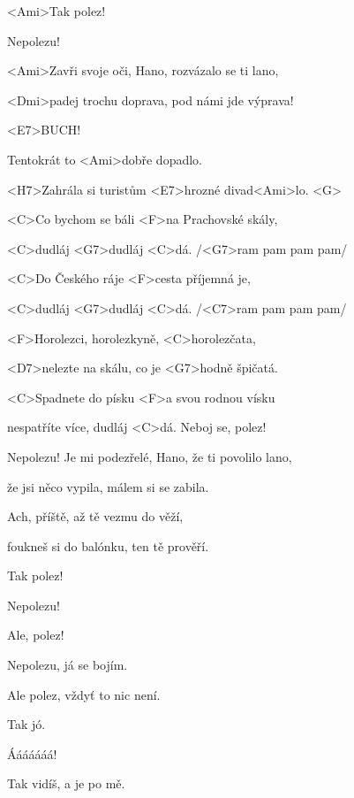 

<Ami>Tak polez!

Nepolezu!

\zs
<Ami>Zavři svoje oči, Hano, rozvázalo se ti lano,

<Dmi>padej trochu doprava, pod námi jde výprava!

<E7>BUCH!

Tentokrát to <Ami>dobře dopadlo.

<H7>Zahrála si turistům <E7>hrozné divad<Ami>lo. <G> \ks

\zr
<C>Co bychom se báli <F>na Prachovské skály,

<C>dudláj <G7>dudláj <C>dá. /<G7>ram pam pam pam/

<C>Do Českého ráje <F>cesta příjemná je,

<C>dudláj <G7>dudláj <C>dá. /<C7>ram pam pam pam/

<F>Horolezci, horolezkyně, <C>horolezčata,

<D7>nelezte na skálu, co je <G7>hodně špičatá.

<C>Spadnete do písku <F>a svou rodnou vísku

nespatříte více, dudláj <C>dá.
\kr
Neboj se, polez!

Nepolezu!
\zs
Je mi podezřelé, Hano, že ti povolilo lano,

že jsi něco vypila, málem si se zabila.

Ach, příště, až tě vezmu do věží,

foukneš si do balónku, ten tě prověří.
\ks

\zr	\kr

Tak polez!

Nepolezu!

Ale, polez!

Nepolezu, já se bojím.

Ale polez, vždyť to nic není.

Tak jó.

Ááááááá!

Tak vidíš, a je po mě.

\kp


